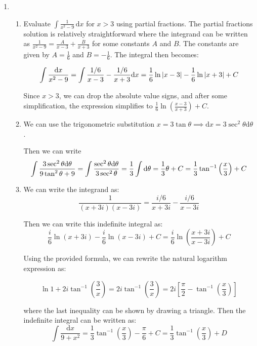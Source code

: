 
	
\begin{enumerate}
\item 
\begin{enumerate}
    \item Evaluate $\int \frac{1}{x^2 - 9}\,\mathrm dx$ for $x > 3$ using partial fractions.	
	The partial fractions solution is relatively straightforward where the integrand can be written as $\frac{1}{x^2 - 9} = \frac{A}{x-3} + \frac{B}{x+3}$ for some constants $A$ and $B$. The constants are given by $A = \frac{1}{6}$ and $B = -\frac{1}{6}$. The integral then becomes:
	    
    \[
        \int\frac{\mathrm dx}{x^2-9} \\
        = \int\frac{1/6}{x-3} - \frac{1/6}{x+3}\mathrm dx \\
        = \frac{1}{6}\ln|x-3| - \frac{1}{6}\ln|x+3| + C
    \]
    
    Since $x > 3$, we can drop the absolute value signs, and after some simplification, the expression simplifies to $\frac{1}{6}\ln\left(\frac{x-3}{x+3}\right) + C$.

    \item We can use the trigonometric substitution $x = 3\tan{\theta} \implies \mathrm dx = 3\sec^2\theta \mathrm d\theta$.

    Then we can write
    \[
    \int \frac{3\sec^2\theta\mathrm d\theta}{9\tan^2\theta + 9}\\
    =\int\frac{\sec^2\theta\mathrm d\theta}{3\sec^2\theta} = \frac{1}{3}\int\mathrm d\theta = \frac{1}{3}\theta+C = \frac{1}{3}\tan^{-1}\left(\frac{x}{3}\right)+C
    \]

    \item We can write the integrand as: 
    \[
    \frac{1}{(x+3i)(x-3i)} = \frac{i/6}{x+3i} - \frac{i/6}{x-3i}
    \]

    Then we can write this indefinite integral as:
    \[
    \frac{i}{6}\ln(x+3i) - \frac{i}{6}\ln(x-3i) + C = \frac{i}{6}\ln\left(\frac{x+3i}{x-3i}\right) + C
    \]

    Using the provided formula, we can rewrite the natural logarithm expression as:

    \[
    \ln1 + 2i\tan^{-1}\left(\frac{3}{x}\right) = 2i\tan^{-1}\left(\frac{3}{x}\right) = 2i\left[\frac{\pi}{2} - \tan^{-1}\left(\frac{x}{3}\right)\right]
    \]

    where the last inequality can be shown by drawing a triangle. Then the indefinite integral can be written as:
    \[
    \int\frac{\mathrm dx}{9+x^2} = \frac{1}{3}\tan^{-1}\left(\frac{x}{3}\right) - \frac{\pi}{6} + C = \frac{1}{3}\tan^{-1}\left(\frac{x}{3}\right) + D
    \]


\end{enumerate}
\end{enumerate}
